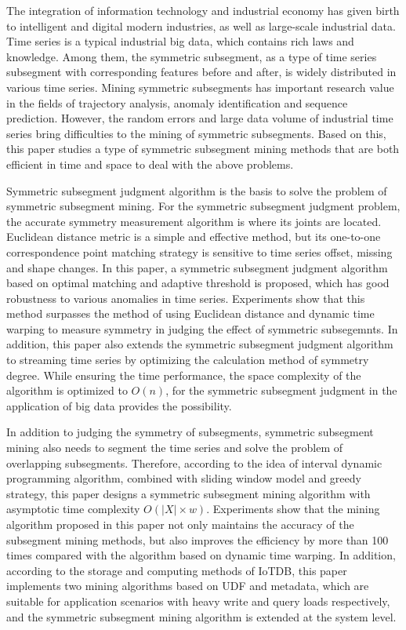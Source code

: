 \begin{abstract*}
  The integration of information technology and 
  industrial economy has given birth to intelligent 
  and digital modern industries, as well as 
  large-scale industrial data. Time series is a 
  typical industrial big data, which contains rich 
  laws and knowledge. Among them, the symmetric 
  subsegment, as a type of time series subsegment 
  with corresponding features before and after, 
  is widely distributed in various time series. 
  Mining symmetric subsegments has important research 
  value in the fields of trajectory analysis, 
  anomaly identification and sequence prediction. 
  However, the random errors and large data volume of 
  industrial time series bring difficulties to the mining 
  of symmetric subsegments. Based on this, this paper 
  studies a type of symmetric subsegment mining 
  methods that are both efficient in time and space 
  to deal with the above problems.

  Symmetric subsegment judgment algorithm is the 
  basis to solve the problem of symmetric subsegment 
  mining. For the symmetric subsegment judgment problem, 
  the accurate symmetry measurement algorithm is 
  where its joints are located. Euclidean distance 
  metric is a simple and effective method, but its 
  one-to-one correspondence point matching strategy 
  is sensitive to time series offset, missing and 
  shape changes. In this paper, a symmetric subsegment 
  judgment algorithm based on optimal matching and 
  adaptive threshold is proposed, which has good 
  robustness to various anomalies in time series. 
  Experiments show that this method surpasses the 
  method of using Euclidean distance and dynamic 
  time warping to measure symmetry in judging the 
  effect of symmetric subsegemnts. In addition, 
  this paper also extends the symmetric subsegment 
  judgment algorithm to streaming time series 
  by optimizing the calculation method of symmetry 
  degree. While ensuring the time performance, 
  the space complexity of the algorithm is optimized 
  to $O(n)$, for the symmetric subsegment judgment 
  in the application of big data provides the 
  possibility.

  In addition to judging the symmetry of subsegments, 
  symmetric subsegment mining also needs to segment 
  the time series and solve the problem of overlapping 
  subsegments. Therefore, according to the idea of 
  interval dynamic programming algorithm, combined 
  with sliding window model and greedy strategy, 
  this paper designs a symmetric subsegment mining 
  algorithm with asymptotic time complexity 
  $O\left( \left| X \right| \times w \right)$. 
  Experiments show that the mining algorithm proposed 
  in this paper not only maintains the accuracy of 
  the subsegment mining methods, but also improves 
  the efficiency by more than 100 times compared 
  with the algorithm based on dynamic time warping. 
  In addition, according to the storage and computing 
  methods of IoTDB, this paper implements two mining 
  algorithms based on UDF and metadata, which are 
  suitable for application scenarios with heavy write 
  and query loads respectively, and the symmetric 
  subsegment mining algorithm is extended at the 
  system level.


\end{abstract*}
